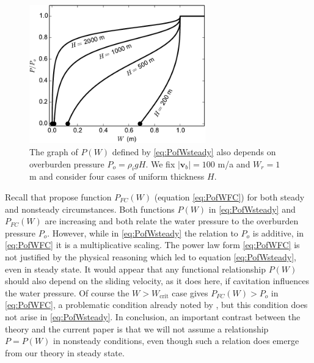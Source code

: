 \documentclass[gmd]{copernicus}   %
\newcommand{\text}{\textrm}
\newcommand\bv{\mathbf{v}}
\begin{document}
\begin{figure}[ht]
\includegraphics[width=3.0in,keepaspectratio=true]{psteady-Po}
\caption{The graph of $P(W)$ defined by \eqref{eq:PofWsteady} also depends on overburden pressure $P_o=\rho_i g H$.  We fix $|\bv_b|=100$ m/a and $W_r=1$ m and consider four cases of uniform thickness $H$.}
\label{fig:psteady-Po}
\end{figure}

Recall that \cite{FlowersClarke2002_theory} propose function $P_{FC}(W)$ (equation \eqref{eq:PofWFC}) for both steady and nonsteady circumstances.  Both functions $P(W)$ in \eqref{eq:PofWsteady} and $P_{FC}(W)$ are increasing and both relate the water pressure to the overburden pressure $P_o$.  However, while in \eqref{eq:PofWsteady} the relation to $P_o$ is additive, in \eqref{eq:PofWFC} it is a multiplicative scaling.  The power law form \eqref{eq:PofWFC} is not justified by the physical reasoning which led to equation \eqref{eq:PofWsteady}, even in steady state.   It would appear that any functional relationship $P(W)$ should also depend on the sliding velocity, as it does here, if cavitation influences the water pressure.  Of course the $W>W_{\text{crit}}$ case gives $P_{FC}(W) > P_o$ in \eqref{eq:PofWFC}, a problematic condition already noted by \cite{Schoofetal2012}, but this condition does not arise in \eqref{eq:PofWsteady}.  In conclusion, an important contrast between the \cite{FlowersClarke2002_theory} theory and the current paper is that we will not assume a relationship $P=P(W)$ in nonsteady conditions, even though such a relation does emerge from our theory in steady state.
\end{document}
